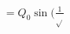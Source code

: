 \documentclass[preview]{standalone}
\begin{document}
\begin{align*}
= Q_0 \sin(\frac{1}{\sqrt{}}
\end{align*}
\end{document}
